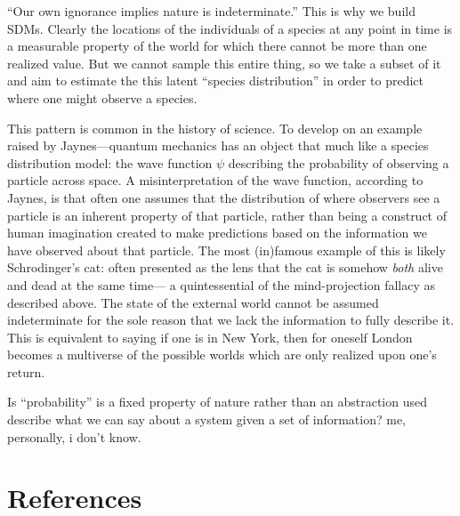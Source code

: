 \documentclass[11pt]{article}
\begin{document}
``Our own ignorance implies nature is indeterminate.'' This is why we
build SDMs. Clearly the locations of the individuals of a species at any
point in time is a measurable property of the world for which there
cannot be more than one realized value. But we cannot sample this entire
thing, so we take a subset of it and aim to estimate the this latent
``species distribution'' in order to predict where one might observe a
species.

This pattern is common in the history of science. To develop on an
example raised by Jaynes---quantum mechanics has an object that much
like a species distribution model: the wave function \(\psi\) describing
the probability of observing a particle across space. A
misinterpretation of the wave function, according to Jaynes, is that
often one assumes that the distribution of where observers see a
particle is an inherent property of that particle, rather than being a
construct of human imagination created to make predictions based on the
information we have observed about that particle. The most (in)famous
example of this is likely Schrodinger's cat: often presented as the lens
that the cat is somehow \emph{both} alive and dead at the same time--- a
quintessential of the mind-projection fallacy as described above. The
state of the external world cannot be assumed indeterminate for the sole
reason that we lack the information to fully describe it. This is
equivalent to saying if one is in New York, then for oneself London
becomes a multiverse of the possible worlds which are only realized upon
one's return.

Is ``probability'' is a fixed property of nature rather than an
abstraction used describe what we can say about a system given a set of
information? me, personally, i don't know.

\hypertarget{references}{%
\section{References}\label{references}}
\end{document}
